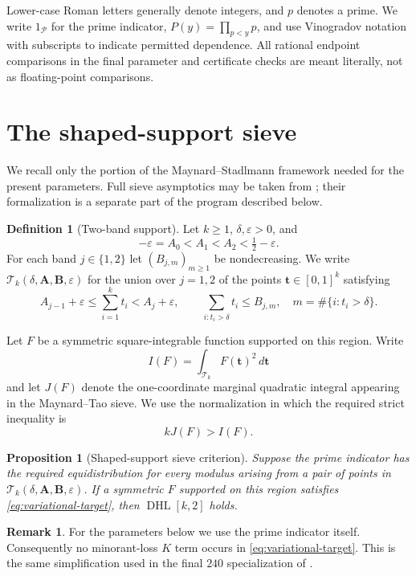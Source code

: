 \documentclass[11pt]{amsart}
\newtheorem{proposition}[theorem]{Proposition}
\theoremstyle{definition}
\newtheorem{definition}[theorem]{Definition}
\newtheorem{remark}[theorem]{Remark}
\newcommand{\Pcal}{\mathcal P}
\newcommand{\Tcal}{\mathcal T}
\newcommand{\DHL}{\operatorname{DHL}}
\begin{document}
Lower-case Roman letters generally denote integers, and $p$ denotes a prime.
We write $1_{\Pcal}$ for the prime indicator, $P(y)=\prod_{p<y}p$, and use
Vinogradov notation with subscripts to indicate permitted dependence.  All
rational endpoint comparisons in the final parameter and certificate checks
are meant literally, not as floating-point comparisons.

\section{The shaped-support sieve}\label{sec:sieve}

We recall only the portion of the Maynard--Stadlmann framework needed for the
present parameters.  Full sieve asymptotics may be taken from
\cite{Stadlmann2026}; their formalization is a separate part of the program
described below.

\begin{definition}[Two-band support]\label{def:support}
Let $k\geq1$, $\delta,\varepsilon>0$, and
\[
  -\varepsilon=A_0<A_1<A_2<\tfrac12-\varepsilon.
\]
For each band $j\in\{1,2\}$ let $(B_{j,m})_{m\geq1}$ be nondecreasing.  We
write $\Tcal_k(\delta,\mathbf A,\mathbf B,\varepsilon)$ for the union over
$j=1,2$ of the points $\mathbf t\in[0,1]^k$ satisfying
\[
 A_{j-1}+\varepsilon\leq \sum_{i=1}^k t_i<A_j+\varepsilon,
 \qquad
 \sum_{i:t_i>\delta}t_i\leq B_{j,m},
 \quad m=\#\{i:t_i>\delta\}.
\]
\end{definition}

Let $F$ be a symmetric square-integrable function supported on this region.
Write
\[
 I(F)=\int_{\Tcal_k}F(\mathbf t)^2\,d\mathbf t
\]
and let $J(F)$ denote the one-coordinate marginal quadratic integral appearing
in the Maynard--Tao sieve.  We use the normalization in which the required
strict inequality is
\begin{equation}\label{eq:variational-target}
  kJ(F)>I(F).
\end{equation}

\begin{proposition}[Shaped-support sieve criterion]\label{prop:sieve}
Suppose the prime indicator has the required equidistribution for every modulus
arising from a pair of points in
$\Tcal_k(\delta,\mathbf A,\mathbf B,\varepsilon)$.  If a symmetric $F$
supported on this region satisfies \eqref{eq:variational-target}, then
$\DHL[k,2]$ holds.
\end{proposition}

\begin{remark}
For the parameters below we use the prime indicator itself.  Consequently no
minorant-loss $K$ term occurs in \eqref{eq:variational-target}.  This is the
same simplification used in the final $240$ specialization of
\cite{Stadlmann2026}.
\end{remark}
\end{document}
